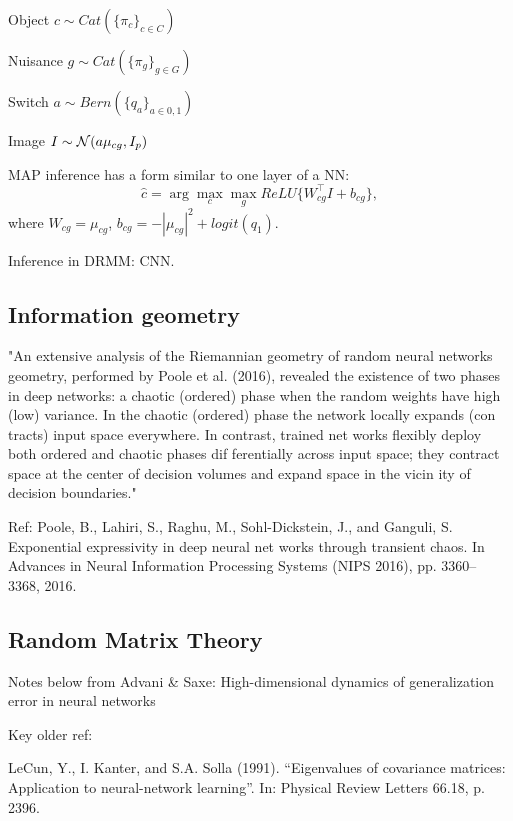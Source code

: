 \documentclass[english]{article}
\begin{document}
\bitem
\item Object $c \sim Cat(\{\pi_c\}_{c\in C})$
\item Nuisance $g \sim Cat(\{\pi_g\}_{g\in G})$
\item Switch $a \sim Bern(\{q_a\}_{a\in 0,1})$
\item Image $I \sim \mathcal{N}(a\mu_{cg},I_p)$ 
\eitem

\begin{theorem}
MAP inference has a form similar to one layer of a NN:  $$\hat c = \arg\max_c \max_g ReLU\{W_{cg}^\top I+b_{cg}\},$$
where $W_{cg} = \mu_{cg}$, $b_{cg}  = - |\mu_{cg}|^2+logit(q_1)$.
\end{theorem}

Inference in DRMM: CNN. 

\subsection{Information geometry}


\benum
\item "An extensive analysis of the Riemannian geometry of random neural networks  geometry, performed by Poole et al. (2016), revealed the existence of two phases in deep networks: a chaotic (ordered) phase
when the random weights have high (low) variance. In the
chaotic (ordered) phase the network locally expands (con
tracts) input space everywhere. In contrast, trained net
works flexibly deploy both ordered and chaotic phases dif
ferentially across input space; they contract space at the
center of decision volumes and expand space in the vicin
ity of decision boundaries." 

Ref: Poole, B., Lahiri, S., Raghu, M., Sohl-Dickstein, J., and
Ganguli, S. Exponential expressivity in deep neural net
works through transient chaos. In Advances in Neural
Information Processing Systems (NIPS 2016), pp. 3360–
3368, 2016.

\eenum

\subsection{Random Matrix Theory}


\benum
\item Notes below from Advani \& Saxe: High-dimensional dynamics of generalization error
in neural networks
\item Key older ref: 

LeCun, Y., I. Kanter, and S.A. Solla (1991). “Eigenvalues of covariance matrices: Application
to neural-network learning”. In: Physical Review Letters 66.18, p. 2396.
\end{document}
